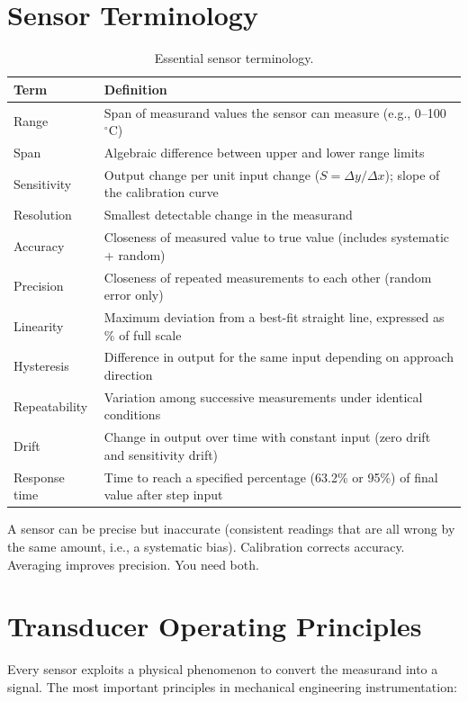 \documentclass[11pt,letterpaper,twoside,openany]{book}
\newcommand{\degC}{\ensuremath{{}^{\circ}\text{C}}}
\begin{document}
\section{Sensor Terminology}
\begin{table}[htbp]\centering\small
\begin{tabularx}{\textwidth}{l X}
\toprule
\textbf{Term} & \textbf{Definition} \\
\midrule
Range & Span of measurand values the sensor can measure (e.g., 0--100\,\degC{}) \\
Span & Algebraic difference between upper and lower range limits \\
Sensitivity & Output change per unit input change ($S = \Delta y / \Delta x$); slope of the calibration curve \\
Resolution & Smallest detectable change in the measurand \\
Accuracy & Closeness of measured value to true value (includes systematic + random) \\
Precision & Closeness of repeated measurements to each other (random error only) \\
Linearity & Maximum deviation from a best-fit straight line, expressed as \% of full scale \\
Hysteresis & Difference in output for the same input depending on approach direction \\
Repeatability & Variation among successive measurements under identical conditions \\
Drift & Change in output over time with constant input (zero drift and sensitivity drift) \\
Response time & Time to reach a specified percentage (63.2\% or 95\%) of final value after step input \\
\bottomrule
\end{tabularx}
\caption{Essential sensor terminology.}
\end{table}

\begin{warningbox}
A sensor can be precise but inaccurate (consistent readings that are all wrong by the same amount, i.e., a systematic bias). Calibration corrects accuracy. Averaging improves precision. You need both.
\end{warningbox}


\section{Transducer Operating Principles}
Every sensor exploits a physical phenomenon to convert the measurand into a signal. The most important principles in mechanical engineering instrumentation:
\end{document}
